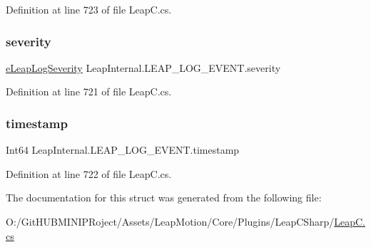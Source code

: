 Definition at line 723 of file Leap\+C.\+cs.

\mbox{\label{struct_leap_internal_1_1_l_e_a_p___l_o_g___e_v_e_n_t_af08da5c9f1c97a5553bdc1d8dc48495e}} 
\subsubsection{\texorpdfstring{severity}{severity}}
{\footnotesize\ttfamily \mbox{\hyperlink{namespace_leap_internal_ae47258155c35d1f200b0dd25bd0adb5b}{e\+Leap\+Log\+Severity}} Leap\+Internal.\+L\+E\+A\+P\+\_\+\+L\+O\+G\+\_\+\+E\+V\+E\+N\+T.\+severity}



Definition at line 721 of file Leap\+C.\+cs.

\mbox{\label{struct_leap_internal_1_1_l_e_a_p___l_o_g___e_v_e_n_t_af1e2c622bfd1802af9f4b9a49b2f641b}} 
\subsubsection{\texorpdfstring{timestamp}{timestamp}}
{\footnotesize\ttfamily Int64 Leap\+Internal.\+L\+E\+A\+P\+\_\+\+L\+O\+G\+\_\+\+E\+V\+E\+N\+T.\+timestamp}



Definition at line 722 of file Leap\+C.\+cs.



The documentation for this struct was generated from the following file\+:\begin{DoxyCompactItemize}
\item 
O\+:/\+Git\+H\+U\+B\+M\+I\+N\+I\+P\+Roject/\+Assets/\+Leap\+Motion/\+Core/\+Plugins/\+Leap\+C\+Sharp/\mbox{\hyperlink{_leap_c_8cs}{Leap\+C.\+cs}}\end{DoxyCompactItemize}
